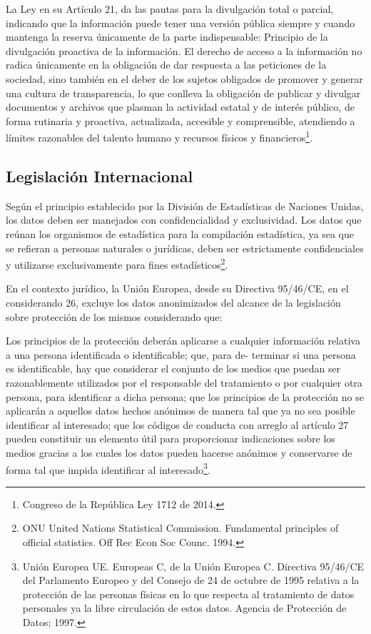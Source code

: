 \documentclass[a4paper,openright,12pt]{book}
\theoremstyle{definition}
\theoremstyle{remark}
\begin{document}
La Ley en su Artículo 21, da las pautas para la divulgación total o parcial, indicando que la información puede tener una versión pública siempre y cuando mantenga la reserva únicamente de la parte indispensable:
Principio de la divulgación proactiva de la información. El derecho de acceso a la información no radica únicamente en la obligación de dar respuesta a las peticiones de la sociedad, sino también en el deber de los sujetos obligados de promover y generar una cultura de transparencia, lo que conlleva la obligación de publicar y divulgar documentos y archivos que plasman la actividad estatal y de interés público, de forma rutinaria y proactiva, actualizada, accesible y comprensible, atendiendo a límites razonables del talento humano y recursos físicos y financieros\footnote{Congreso de la República Ley 1712 de 2014.}.

\subsection{Legislación Internacional}

Según el principio establecido por la División de Estadísticas de Naciones Unidas, los datos deben ser manejados con confidencialidad y exclusividad.
Los datos que reúnan los organismos de estadística para la compilación estadística, ya sea que se refieran a personas naturales o jurídicas, deben ser estrictamente confidenciales y utilizarse exclusivamente para fines estadísticos\footnote{ONU United Nations Statistical Commission. Fundamental principles of official statistics. Off Rec Econ Soc Counc. 1994.}.

En el contexto jurídico, la Unión Europea, desde su Directiva 95/46/CE, en el considerando 26, excluye los datos anonimizados del alcance de la legislación sobre protección de los mismos considerando que:

Los principios de la protección deberán aplicarse a cualquier información relativa a una persona identificada o identificable; que, para de- terminar si una persona es identificable, hay que considerar el conjunto de los medios que puedan ser razonablemente utilizados por el responsable del tratamiento o por cualquier otra persona, para identificar a dicha persona; que los principios de la protección no se aplicarán a aquellos datos hechos anónimos de manera tal que ya no sea posible identificar al interesado; que los códigos de conducta con arreglo al artículo 27 pueden constituir un elemento útil para proporcionar indicaciones sobre los medios gracias a los cuales los datos pueden hacerse anónimos y conservarse de forma tal que impida identificar al interesado\footnote{Unión Europea UE. Europeas C, de la Unión Europea C. Directiva 95/46/CE del Parlamento Europeo y del Consejo de 24 de octubre de 1995 relativa a la protección de las personas físicas en lo que respecta al tratamiento de datos personales ya la libre circulación de estos datos. Agencia de Protección de Datos; 1997.}.
\end{document}
